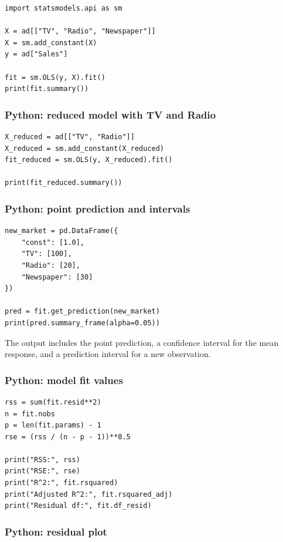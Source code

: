 \begin{verbatim}
import statsmodels.api as sm

X = ad[["TV", "Radio", "Newspaper"]]
X = sm.add_constant(X)
y = ad["Sales"]

fit = sm.OLS(y, X).fit()
print(fit.summary())
\end{verbatim}

\subsubsection*{Python: reduced model with TV and Radio}

\begin{verbatim}
X_reduced = ad[["TV", "Radio"]]
X_reduced = sm.add_constant(X_reduced)
fit_reduced = sm.OLS(y, X_reduced).fit()

print(fit_reduced.summary())
\end{verbatim}

\subsubsection*{Python: point prediction and intervals}

\begin{verbatim}
new_market = pd.DataFrame({
    "const": [1.0],
    "TV": [100],
    "Radio": [20],
    "Newspaper": [30]
})

pred = fit.get_prediction(new_market)
print(pred.summary_frame(alpha=0.05))
\end{verbatim}

The output includes the point prediction, a confidence interval for the mean response, and a prediction interval for a new observation.

\subsubsection*{Python: model fit values}

\begin{verbatim}
rss = sum(fit.resid**2)
n = fit.nobs
p = len(fit.params) - 1
rse = (rss / (n - p - 1))**0.5

print("RSS:", rss)
print("RSE:", rse)
print("R^2:", fit.rsquared)
print("Adjusted R^2:", fit.rsquared_adj)
print("Residual df:", fit.df_resid)
\end{verbatim}

\subsubsection*{Python: residual plot}

